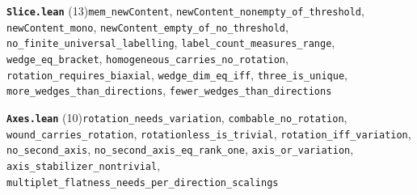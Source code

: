 \documentclass[11pt,a4paper]{article}
\theoremstyle{sudef}
\begin{document}
\noindent\textbf{\texttt{Slice.lean}} (13)\quad \texttt{mem\_\allowbreak newContent}, \texttt{newContent\_\allowbreak nonempty\_\allowbreak of\_\allowbreak threshold}, \texttt{newContent\_\allowbreak mono}, \texttt{newContent\_\allowbreak empty\_\allowbreak of\_\allowbreak no\_\allowbreak threshold}, \texttt{no\_\allowbreak finite\_\allowbreak universal\_\allowbreak labelling}, \texttt{label\_\allowbreak count\_\allowbreak measures\_\allowbreak range}, \texttt{wedge\_\allowbreak eq\_\allowbreak bracket}, \texttt{homogeneous\_\allowbreak carries\_\allowbreak no\_\allowbreak rotation}, \texttt{rotation\_\allowbreak requires\_\allowbreak biaxial}, \texttt{wedge\_\allowbreak dim\_\allowbreak eq\_\allowbreak iff}, \texttt{three\_\allowbreak is\_\allowbreak unique}, \texttt{more\_\allowbreak wedges\_\allowbreak than\_\allowbreak directions}, \texttt{fewer\_\allowbreak wedges\_\allowbreak than\_\allowbreak directions}\par\smallskip
\noindent\textbf{\texttt{Axes.lean}} (10)\quad \texttt{rotation\_\allowbreak needs\_\allowbreak variation}, \texttt{combable\_\allowbreak no\_\allowbreak rotation}, \texttt{wound\_\allowbreak carries\_\allowbreak rotation}, \texttt{rotationless\_\allowbreak is\_\allowbreak trivial}, \texttt{rotation\_\allowbreak iff\_\allowbreak variation}, \texttt{no\_\allowbreak second\_\allowbreak axis}, \texttt{no\_\allowbreak second\_\allowbreak axis\_\allowbreak eq\_\allowbreak rank\_\allowbreak one}, \texttt{axis\_\allowbreak or\_\allowbreak variation}, \texttt{axis\_\allowbreak stabilizer\_\allowbreak nontrivial}, \texttt{multiplet\_\allowbreak flatness\_\allowbreak needs\_\allowbreak per\_\allowbreak direction\_\allowbreak scalings}\par\smallskip
\end{document}
